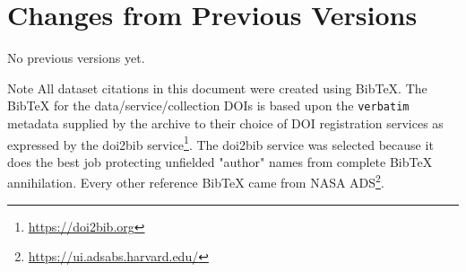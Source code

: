 \documentclass[11pt,a4paper]{ivoa}
\begin{document}
\section{Changes from Previous Versions}

No previous versions yet.

\clearpage
\begin{admonition}{Note}
	All dataset citations in this document were created using BibTeX. The BibTeX for the data/service/collection DOIs is based upon the \texttt{verbatim} metadata supplied by the archive to their choice of DOI registration services as expressed by the doi2bib service\footnote{\url{https://doi2bib.org}}. The doi2bib service was selected because it does the best job protecting unfielded "author" names from complete BibTeX annihilation.
	Every other reference BibTeX came from NASA ADS\footnote{\url{https://ui.adsabs.harvard.edu/}}.
\end{admonition}

%

	
\end{document}
